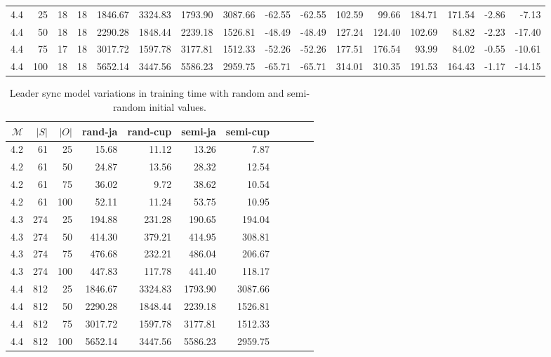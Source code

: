 \begin{table*}
\begin{tabular}{rrrrrrrrrrrrrrrr}
        4.4           & 25    & 18    & 18     & 1846.67  & 3324.83   & 1793.90   & 3087.66    & -62.55     & -62.55      & 102.59     & 99.66       & 184.71      & 171.54       & -2.86     & -7.13      \\
        4.4           & 50    & 18    & 18     & 2290.28  & 1848.44   & 2239.18   & 1526.81    & -48.49     & -48.49      & 127.24     & 124.40      & 102.69      & 84.82        & -2.23     & -17.40     \\
        4.4           & 75    & 17    & 18     & 3017.72  & 1597.78   & 3177.81   & 1512.33    & -52.26     & -52.26      & 177.51     & 176.54      & 93.99       & 84.02        & -0.55     & -10.61     \\
        4.4           & 100   & 18    & 18     & 5652.14  & 3447.56   & 5586.23   & 2959.75    & -65.71     & -65.71      & 314.01     & 310.35      & 191.53      & 164.43       & -1.17     & -14.15     \\
        \bottomrule
    \end{tabular}
\end{table*}

\begin{table}
    \centering
    \caption{Leader sync model variations in training time with random and semi-random initial values.}
    \label{tab:leader_results_rand_vs_semi}
    \begin{tabular}{rrrrrrrrrrr}
        \toprule
        $\mathcal{M}$ & $|S|$ & $|O|$ & rand-ja & rand-cup & semi-ja & semi-cup \\
        \midrule
        4.2           & 61    & 25    & 15.68   & 11.12    & 13.26   & 7.87     \\
        4.2           & 61    & 50    & 24.87   & 13.56    & 28.32   & 12.54    \\
        4.2           & 61    & 75    & 36.02   & 9.72     & 38.62   & 10.54    \\
        4.2           & 61    & 100   & 52.11   & 11.24    & 53.75   & 10.95    \\
        4.3           & 274   & 25    & 194.88  & 231.28   & 190.65  & 194.04   \\
        4.3           & 274   & 50    & 414.30  & 379.21   & 414.95  & 308.81   \\
        4.3           & 274   & 75    & 476.68  & 232.21   & 486.04  & 206.67   \\
        4.3           & 274   & 100   & 447.83  & 117.78   & 441.40  & 118.17   \\
        4.4           & 812   & 25    & 1846.67 & 3324.83  & 1793.90 & 3087.66  \\
        4.4           & 812   & 50    & 2290.28 & 1848.44  & 2239.18 & 1526.81  \\
        4.4           & 812   & 75    & 3017.72 & 1597.78  & 3177.81 & 1512.33  \\
        4.4           & 812   & 100   & 5652.14 & 3447.56  & 5586.23 & 2959.75  \\
        \bottomrule
    \end{tabular}
\end{table}

